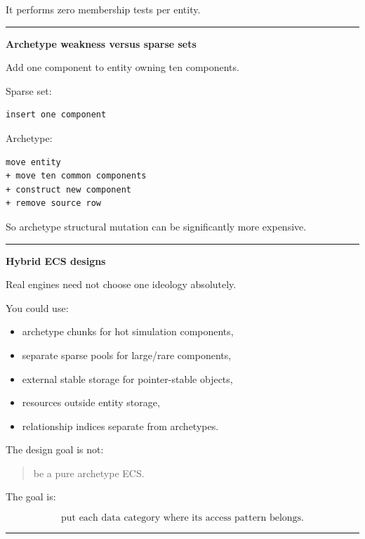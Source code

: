 It performs zero membership tests per entity.

\begin{center}\rule{0.5\linewidth}{0.5pt}\end{center}

\textbf{Archetype weakness versus sparse sets}

Add one component to entity owning ten components.

Sparse set:

\begin{verbatim}
insert one component
\end{verbatim}

Archetype:

\begin{verbatim}
move entity
+ move ten common components
+ construct new component
+ remove source row
\end{verbatim}

So archetype structural mutation can be significantly more expensive.

\begin{center}\rule{0.5\linewidth}{0.5pt}\end{center}

\textbf{Hybrid ECS designs}

Real engines need not choose one ideology absolutely.

You could use:

\begin{itemize}
\tightlist
\item
  archetype chunks for hot simulation components,
\item
  separate sparse pools for large/rare components,
\item
  external stable storage for pointer-stable objects,
\item
  resources outside entity storage,
\item
  relationship indices separate from archetypes.
\end{itemize}

The design goal is not:

\begin{quote}
be a pure archetype ECS.
\end{quote}

The goal is:

\[
\boxed{
\text{put each data category where its access pattern belongs}.
}
\]

\begin{center}\rule{0.5\linewidth}{0.5pt}\end{center}

